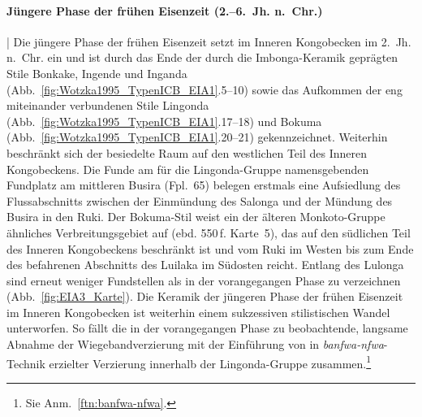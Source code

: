 \paragraph{Jüngere Phase der frühen Eisenzeit (2.--6.~Jh. n.~Chr.)}\hspace{-.5em}|\hspace{.5em}%
Die jüngere Phase der frühen Eisenzeit setzt im Inneren Kongobecken im 2.~Jh. n.~Chr. ein und ist durch das Ende der durch die Imbonga-Keramik geprägten Stile Bonkake, Ingende und Inganda (Abb.~\ref{fig:Wotzka1995_TypenICB_EIA1}.5--10) sowie das Aufkommen der eng miteinander verbundenen Stile Lingonda (Abb.~\ref{fig:Wotzka1995_TypenICB_EIA1}.17--18) und Bokuma (Abb.~\ref{fig:Wotzka1995_TypenICB_EIA1}.20--21) gekennzeichnet. Weiterhin beschränkt sich der besiedelte Raum auf den westlichen Teil des Inneren Kongobeckens. Die Funde am für die Lingonda-Gruppe namensgebenden Fundplatz am mittleren Busira (Fpl.~65) belegen erstmals eine Aufsiedlung des Flussabschnitts zwischen der Einmündung des Salonga und der Mündung des Busira in den Ruki. Der Bokuma-Stil \parencite[556\,f. Karte~8]{Wotzka.1995} weist ein der älteren Monkoto-Gruppe ähnliches Verbreitungsgebiet auf (ebd. 550\,f. Karte~5), das auf den südlichen Teil des Inneren Kongobeckens beschränkt ist und vom Ruki im Westen bis zum Ende des befahrenen Abschnitts des Luilaka im Südosten reicht. Entlang des Lulonga sind erneut weniger Fundstellen als in der vorangegangen Phase zu verzeichnen (Abb.~\ref{fig:EIA3_Karte}). Die Keramik der jüngeren Phase der frühen Eisenzeit im Inneren Kongobecken ist weiterhin einem sukzessiven stilistischen Wandel unterworfen. So fällt die in der vorangegangen Phase zu beobachtende, langsame Abnahme der Wiegebandverzierung mit der Einführung von in \textit{banfwa-nfwa}-Technik erzielter Verzierung innerhalb der Lingonda-Gruppe zusammen.\footnote{Sie Anm.~\ref{ftn:banfwa-nfwa}.}


